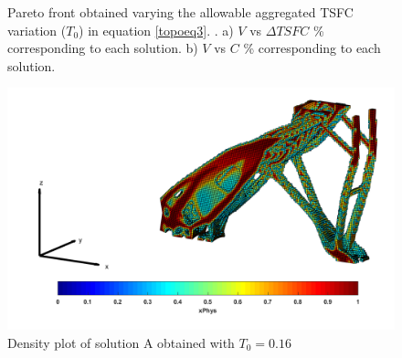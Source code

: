 \begin{figure}[hbt!]
  \centering
       \caption{Pareto front obtained varying the allowable aggregated TSFC variation ($T_0$) in equation  \ref{topoeq3}.  . a) $V$ vs $\Delta TSFC$ \% corresponding to each solution. b) $V$ vs $C$ \% corresponding to each solution.   }
       \label{fig.B21}
\end{figure}
\begin{figure}[ht]
 \centering
\includegraphics[width=\textwidth]{images/Ch2/SOL_A}
 \caption{Density plot of solution A obtained with $T_0=0.16$}
\label{fig.B22}
\end{figure}
